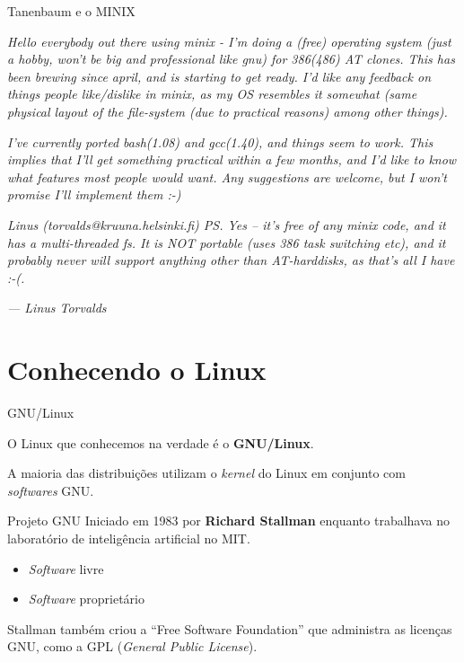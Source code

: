 \documentclass[size=14pt,
style=paintings
]{powerdot}
\newenvironment{vslide}{\vspace{\stretch{1}}}{\vspace{\stretch{1}}}
\begin{document}
\begin{slide}{Tanenbaum e o MINIX}

\footnotesize \emph{Hello everybody out there using minix -
 I'm doing a (free) operating system (just a hobby, won't be big and professional like gnu) for 386(486) AT clones. This has been brewing since april, and is starting to get ready. I'd like any feedback on things people like/dislike in minix, as my OS resembles it somewhat (same physical layout of the file-system (due to practical reasons) among other things).}

\vspace{0.5cm}
 \emph{I've currently ported bash(1.08) and gcc(1.40), and things seem to work. This implies that I'll get something practical within a few months, and I'd like to know what features most people would want. Any suggestions are welcome, but I won't promise I'll implement them :-)}
\vspace{0.5cm}

 \emph{Linus (torvalds@kruuna.helsinki.fi)
 PS. Yes – it's free of any minix code, and it has a multi-threaded fs. It is NOT portable (uses 386 task switching etc), and it probably never will support anything other than AT-harddisks, as that's all I have :-(.
}
\vspace{0.2cm}

 \emph{— Linus Torvalds}
\end{slide}

\section{Conhecendo o Linux}

\begin{slide}{GNU/Linux}

\begin{vslide}
O Linux que conhecemos na verdade é o \textbf{GNU/Linux}.

\vspace{0.5cm}

A maioria das distribuições utilizam o \textit{kernel} do Linux em conjunto com \textit{softwares} GNU.
\end{vslide}

\end{slide}

\begin{slide}{Projeto GNU}
\begin{vslide}
Iniciado em 1983 por \textbf{Richard Stallman} enquanto trabalhava no laboratório de inteligência artificial no MIT.

\vspace{0.5cm}
\begin{itemize}
\item \textit{Software} livre
\item \textit{Software} proprietário
\end{itemize}

\vspace{0.5cm}
Stallman também criou a ``Free Software Foundation'' que administra as licenças GNU, como a GPL (\textit{General Public License}).
\end{vslide}
\end{slide}
\end{document}
